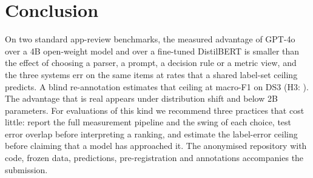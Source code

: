 \documentclass[sigconf,anonymous,review]{acmart}
\newcommand{\fone}{macro-F1\xspace}
\begin{document}
\section{Conclusion}
On two standard app-review benchmarks, the measured advantage of GPT-4o over a 4B open-weight model and over a fine-tuned DistilBERT is smaller than the effect of choosing a parser, a prompt, a decision rule or a metric view, and the three systems err on the same items at rates that a shared label-set ceiling predicts. A blind re-annotation estimates that ceiling at \ceilingDSthree{} \fone on DS3 (H3: \hThreeVerdictDSthree). The advantage that is real appears under distribution shift and below 2B parameters. For evaluations of this kind we recommend three practices that cost little: report the full measurement pipeline and the swing of each choice, test error overlap before interpreting a ranking, and estimate the label-error ceiling before claiming that a model has approached it. The anonymised repository with code, frozen data, predictions, pre-registration and annotations accompanies the submission.



\end{document}
